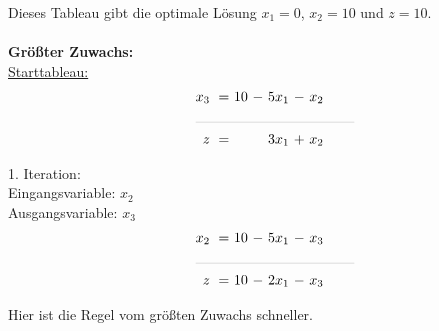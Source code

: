 \documentclass [a4paper,11pt]{article}
\begin{document}
\begin{enumerate}
\begin{enumerate}
\begin{enumerate}
                        Dieses Tableau gibt die optimale Lösung $x_1 = 0$, $x_2 = 10$ und $z = 10$.\\ \\

                        \textbf{Größter Zuwachs:}\\
                        \underline{Starttableau:}
                        \begin{align*}
                        \begin{alignedat}{6}
                        && x_3 &\ = &\ 10 &\ - &\ 5x_1 &\ - &\  x_2 \\
                        &\rlap{\rule{4cm}{.1pt}} &&&&&&&\\
                        && z   &\ = &\    &    &\ 3x_1 &\ + &\  x_2
                        \end{alignedat}
                        \end{align*}

                        1. Iteration:\\
                        Eingangsvariable: $x_2$\\
                        Ausgangsvariable: $x_3$
                        \begin{align*}
                        \begin{alignedat}{6}
                        && x_2 &\ = &\ 10 &\ - &\ 5x_1 &\ - &\ x_3 \\
                        &\rlap{\rule{4cm}{.1pt}} &&&&&&&\\
                        && z   &\ = &\ 10 &\ - &\ 2x_1 &\ - &\ x_3
                        \end{alignedat}
                        \end{align*}

                        Hier ist die Regel vom größten Zuwachs schneller.
                        \newpage


\end{enumerate}
\end{enumerate}
\end{enumerate}
\end{document}
